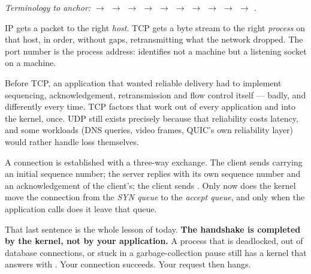 \begin{center}\small\itshape\color{cInk!70}
Terminology to anchor:  $\rightarrow$  $\rightarrow$  $\rightarrow$  $\rightarrow$  $\rightarrow$  $\rightarrow$  $\rightarrow$  $\rightarrow$  $\rightarrow$  $\rightarrow$ .
\end{center}



 IP gets a packet to the right \emph{host}. TCP gets a byte stream to the right \emph{process} on that host, in order, without gaps, retransmitting what the network dropped. The port number is the process address:  identifies not a machine but a listening socket on a machine.

 Before TCP, an application that wanted reliable delivery had to implement sequencing, acknowledgement, retransmission and flow control itself --- badly, and differently every time. TCP factors that work out of every application and into the kernel, once. UDP still exists precisely because that reliability costs latency, and some workloads (DNS queries, video frames, QUIC's own reliability layer) would rather handle loss themselves.

 A connection is established with a three-way exchange. The client sends  carrying an initial sequence number; the server replies  with its own sequence number and an acknowledgement of the client's; the client sends . Only now does the kernel move the connection from the \emph{SYN queue} to the \emph{accept queue}, and only when the application calls  does it leave that queue.

That last sentence is the whole lesson of today. \textbf{The handshake is completed by the kernel, not by your application.} A process that is deadlocked, out of database connections, or stuck in a garbage-collection pause still has a kernel that answers  with . Your connection succeeds. Your request then hangs.

